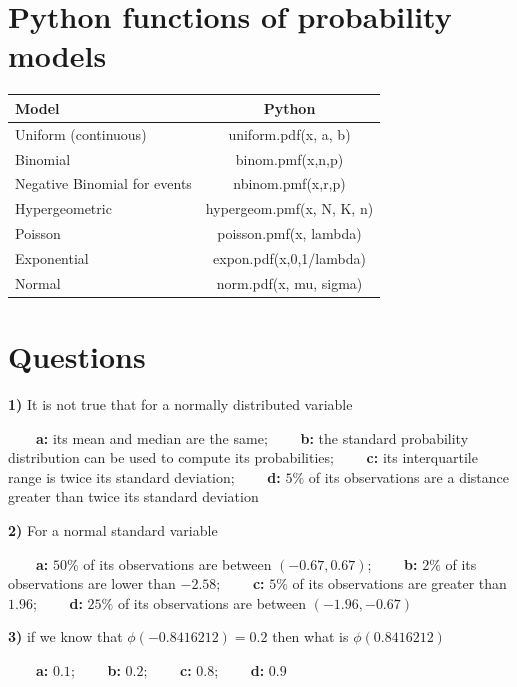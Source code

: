 \documentclass[
]{book}
\begin{document}
\hypertarget{python-functions-of-probability-models}{%
\section{Python functions of probability models}\label{python-functions-of-probability-models}}

\begin{longtable}[]{@{}lc@{}}
\toprule
Model & Python \\
\midrule
\endhead
Uniform (continuous) & uniform.pdf(x, a, b) \\
Binomial & binom.pmf(x,n,p) \\
Negative Binomial for events & nbinom.pmf(x,r,p) \\
Hypergeometric & hypergeom.pmf(x, N, K, n) \\
Poisson & poisson.pmf(x, lambda) \\
Exponential & expon.pdf(x,0,1/lambda) \\
Normal & norm.pdf(x, mu, sigma) \\
\bottomrule
\end{longtable}

\hypertarget{questions-6}{%
\section{Questions}\label{questions-6}}

\textbf{1)} It is not true that for a normally distributed variable

\textbf{\(\qquad\)a:} its mean and median are the same; \textbf{\(\qquad\)b:} the standard probability distribution can be used to compute its probabilities; \textbf{\(\qquad\)c:} its interquartile range is twice its standard deviation; \textbf{\(\qquad\)d:} \(5\%\) of its observations are a distance greater than twice its standard deviation

\textbf{2)} For a normal standard variable

\textbf{\(\qquad\)a:} \(50\%\) of its observations are between \((-0.67,0.67)\);
\textbf{\(\qquad\)b:} \(2\%\) of its observations are lower than \(-2.58\);
\textbf{\(\qquad\)c:} \(5\%\) of its observations are greater than \(1.96\);
\textbf{\(\qquad\)d:} \(25\%\) of its observations are between \((-1.96,-0.67)\)

\textbf{3)} if we know that \(\phi(-0.8416212)=0.2\) then what is \(\phi(0.8416212)\)

\textbf{\(\qquad\)a:} \(0.1\);
\textbf{\(\qquad\)b:} \(0.2\);
\textbf{\(\qquad\)c:} \(0.8\);
\textbf{\(\qquad\)d:} \(0.9\)
\end{document}
